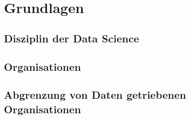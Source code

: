 \chapter[Grundlagen]{Grundlagen}

\section{Disziplin der Data Science}



\section{Organisationen}

\section{Abgrenzung von Daten getriebenen Organisationen}